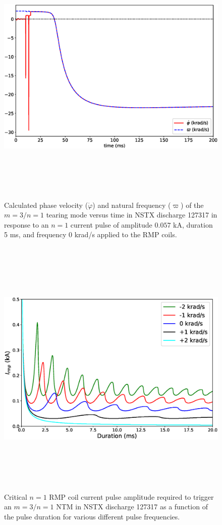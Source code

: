 \documentclass[12pt,prb,aps]{revtex4-1}
\begin{document}
\begin{figure}
\centerline{\includegraphics[height=5in]{Fig7.eps}}
\caption{Calculated phase velocity ($\dot{\varphi}$) and natural frequency ($\varpi$) of the  $m=3/n=1$ tearing mode versus time in NSTX discharge 127317 in response to an $n=1$ current pulse of amplitude $0.057$ kA, duration 5 ms, and frequency 0 krad/s applied to the RMP coils.}\label{fig7}
\end{figure}

\begin{figure}
\centerline{\includegraphics[height=5in]{Fig8.eps}}
\caption{Critical $n=1$ RMP coil current pulse amplitude required to trigger an $m=3/n=1$ NTM in NSTX discharge 127317 
as a function of the pulse duration  for various different pulse frequencies.}\label{fig8}
\end{figure}
\end{document}
